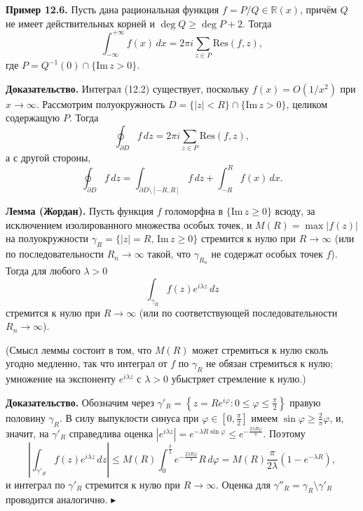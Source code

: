 \documentclass[12pt, a4paper]{article}
\theoremstyle{definition}
\theoremstyle{remark}
\begin{document}
\textbf{Пример 12.6.} Пусть дана рациональная функция $f = P/Q \in \mathbb{R}(x)$, причём $Q$ не имеет действительных корней и $\deg Q \ge \deg P + 2$. Тогда
\begin{equation}
	\int_{-\infty}^{+\infty} f(x) \, dx = 2\pi i \sum_{z \in P} \text{Res}(f, z),
\end{equation}
где $P = Q^{-1}(0) \cap \{\text{Im} \, z > 0\}$.

\textbf{Доказательство.} Интеграл (12.2) существует, поскольку $f(x) = O(1/x^2)$ при $x \to \infty$. Рассмотрим полуокружность $D = \{|z| < R\} \cap \{\text{Im} \, z > 0\}$, целиком содержащую $P$. Тогда
$$\oint_{\partial D} f \, dz = 2\pi i \sum_{z \in P} \text{Res}(f, z),$$
а с другой стороны,
$$\oint_{\partial D} f \, dz = \int_{\partial D \setminus [-R, R]} f \, dz + \int_{-R}^{R} f(x) \, dx.$$

\textbf{Лемма (Жордан).} Пусть функция $f$ голоморфна в $\{\text{Im} \, z \ge 0\}$ всюду, за исключением изолированного множества особых точек, и $M(R) = \max |f(z)|$ на полуокружности $\gamma_R = \{|z| = R, \, \text{Im} \, z \ge 0\}$ стремится к нулю при $R \to \infty$ (или по последовательности $R_n \to \infty$ такой, что $\gamma_{R_n}$ не содержат особых точек $f$). Тогда для любого $\lambda > 0$
\begin{equation}
	\int_{\gamma_R} f(z) e^{i\lambda z} \, dz
\end{equation}
стремится к нулю при $R \to \infty$ (или по соответствующей последовательности $R_n \to \infty$).

(Смысл леммы состоит в том, что $M(R)$ может стремиться к нулю сколь угодно медленно, так что интеграл от $f$ по $\gamma_R$ не обязан стремиться к нулю; умножение на экспоненту $e^{i\lambda z}$ с $\lambda > 0$ убыстряет стремление к нулю.)

\textbf{Доказательство.} Обозначим через $\gamma'_R = \left\{z = R e^{i\varphi}: 0 \le \varphi \le \frac{\pi}{2}\right\}$ правую половину $\gamma_R$. В силу выпуклости синуса при $\varphi \in \left[0, \frac{\pi}{2}\right]$ имеем $\sin \varphi \ge \frac{2}{\pi} \varphi$, и, значит, на $\gamma'_R$ справедлива оценка $|e^{i\lambda z}| = e^{-\lambda R \sin \varphi} \le e^{-\frac{2\lambda R \varphi}{\pi}}$. Поэтому
$$\left| \int_{\gamma'_R} f(z) e^{i\lambda z} \, dz \right| \le M(R) \int_{0}^{\frac{\pi}{2}} e^{-\frac{2\lambda R \varphi}{\pi}} R \, d\varphi = M(R) \frac{\pi}{2\lambda} (1 - e^{-\lambda R}),$$
и интеграл по $\gamma'_R$ стремится к нулю при $R \to \infty$. Оценка для $\gamma''_R = \gamma_R \setminus \gamma'_R$ проводится аналогично. $\blacktriangleright$
\end{document}
